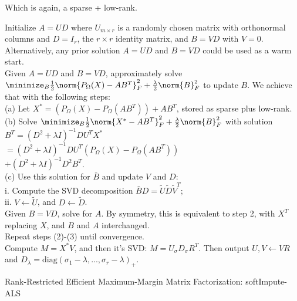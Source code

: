 \documentclass[
]{article}
\begin{document}
Which is again, a sparse + low-rank.

\begin{algorithm}[H]
\SetAlgoLined
{}
 Initialize $A = U D$ where $U_{m \times r}$ is a randomly chosen matrix with orthonormal columns and $D = I_r$, the $r \times r$ identity matrix, and $B = V D$ with $V = 0$. Alternatively, any prior solution $A = UD$ and $B = VD$ could be used as a warm start. \\
 Given $A = UD$ and $B = VD$, approximately solve 
 $\minimize_B \frac{1}{2} \norm{P_{\Omega}(X) - A B^T}_F^2 + \frac{\lambda}{2} \norm{B}_F^2$
 to update $B$. We achieve that with the following steps:\\
 \Indp
 (a) Let $X^* = (P_{\Omega}(X) - P_{\Omega}(AB^T)) + AB^T$, stored as sparse plus low-rank. \\
 (b) Solve $\minimize_B \frac{1}{2} \norm{X^* - AB^T}_F^2 + \frac{\lambda}{2} \norm{B}_F^2$ with solution \\
 $B^T = (D^2 + \lambda I)^{-1} D U^T X^*$ \\
 \qquad $= (D^2 + \lambda I)^{-1} D U^T (P_{\Omega}(X) - P_{\Omega}(AB^T))$ \\
 \qquad $+ (D^2 + \lambda I)^{-1} D^2 B^T$. \\
 (c) Use this solution for $\bar{B}$ and update $V$ and $D$: \\
 \qquad i. Compute the SVD decomposition $\bar{B}D = \tilde{U} \tilde{D} \tilde{V}^T$; \\
 \qquad ii. $V \leftarrow \tilde{U}$, and $D \leftarrow \tilde{D}$. \\
 \Indm
 Given $B = VD$, solve for $A$. By symmetry, this is equivalent to step 2, with $X^T$ replacing $X$, and $B$ and $A$ interchanged. \\
 Repeat steps (2)-(3) until convergence. \\
 Compute $M = X^* V$, and then it's SVD: $M = U_{\sigma} D_{\sigma} R^T$. Then output $U, V \leftarrow V R$ and $D_{\lambda} = \text{diag}(\sigma_1 - \lambda, ..., \sigma_r - \lambda)_+$.
 \caption{Rank-Restricted Efficient Maximum-Margin Matrix Factorization: softImpute-ALS}
\end{algorithm}

\[
\begin{aligned}
\end{aligned}
\]
\end{document}
